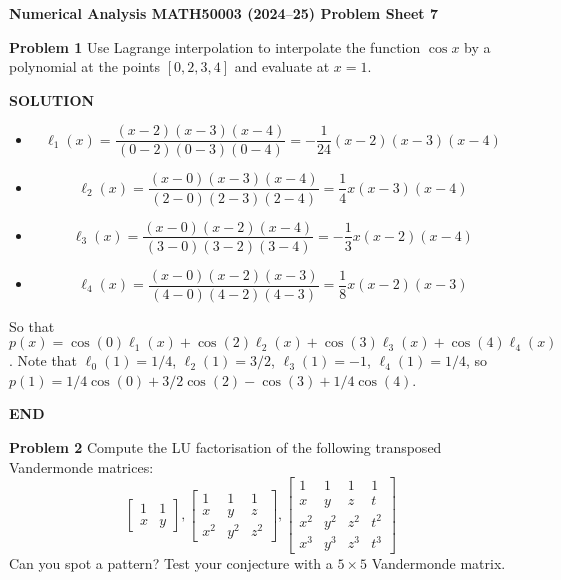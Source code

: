 \documentclass[12pt,a4paper]{article}
\def\endash{–}
\begin{document}
\textbf{Numerical Analysis MATH50003 (2024\ensuremath{\endash}25) Problem Sheet 7}

\textbf{Problem 1} Use Lagrange interpolation to interpolate the function $\cos x$ by a polynomial at the points $[0,2,3,4]$ and evaluate at $x = 1$.

\textbf{SOLUTION}

\begin{itemize}
\item \[
\ensuremath{\ell}_1(x)=\frac{(x-2)(x-3)(x-4)}{(0-2)(0-3)(0-4)}=-\frac{1}{24}(x-2)(x-3)(x-4)
\]

\item \[
\ensuremath{\ell}_2(x)=\frac{(x-0)(x-3)(x-4)}{(2-0)(2-3)(2-4)}=\frac{1}{4}x(x-3)(x-4)
\]

\item \[
\ensuremath{\ell}_3(x)=\frac{(x-0)(x-2)(x-4)}{(3-0)(3-2)(3-4)}=-\frac{1}{3}x(x-2)(x-4)
\]

\item \[
\ensuremath{\ell}_4(x)=\frac{(x-0)(x-2)(x-3)}{(4-0)(4-2)(4-3)}=\frac{1}{8}x(x-2)(x-3)
\]
\end{itemize}
So that $p(x)=\cos(0)\ensuremath{\ell}_1(x)+\cos(2)\ensuremath{\ell}_2(x)+\cos(3)\ensuremath{\ell}_3(x)+\cos(4)\ensuremath{\ell}_4(x)$. Note that $\ensuremath{\ell}_0(1)=1/4$, $\ensuremath{\ell}_2(1)=3/2$, $\ensuremath{\ell}_3(1)=-1$, $\ensuremath{\ell}_4(1)=1/4$, so $p(1)=1/4\cos(0)+3/2\cos(2)-\cos(3)+1/4\cos(4)$.

\textbf{END}

\textbf{Problem 2} Compute the LU factorisation of the following transposed Vandermonde matrices:
\[
\begin{bmatrix}
1 & 1 \\
x & y
\end{bmatrix},
\begin{bmatrix}
1 & 1 & 1 \\
x & y & z \\
x^2 & y^2 & z^2
\end{bmatrix},
\begin{bmatrix}
1 & 1 & 1 & 1 \\
x & y & z & t \\
x^2 & y^2 & z^2 & t^2 \\
x^3 & y^3 & z^3 & t^3
\end{bmatrix}
\]
Can you spot a pattern? Test your conjecture with a $5 \ensuremath{\times} 5$ Vandermonde matrix.
\end{document}
